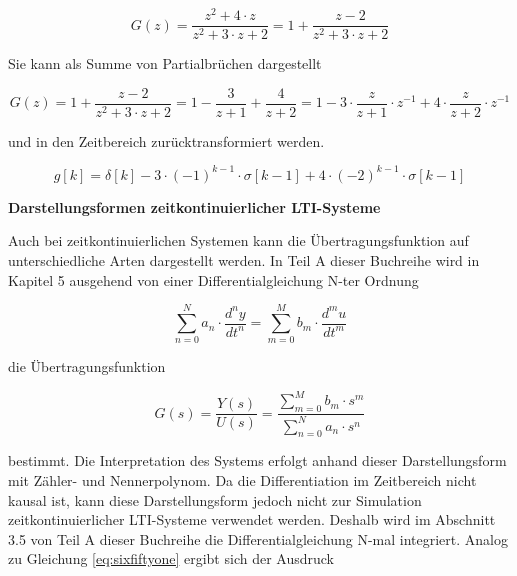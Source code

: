 \begin{equation}\label{eq:sixfiftyeight}
G\left(z\right)=\frac{z^{2} +4\cdot z}{z^{2} +3\cdot z+2} =1+\frac{z-2}{z^{2} +3\cdot z+2}
\end{equation}

\noindent Sie kann als Summe von Partialbr\"{u}chen dargestellt 

\begin{equation}\label{eq:sixfiftynine}
G\left(z\right)=1+\frac{z-2}{z^{2} +3\cdot z+2} =1-\frac{3}{z+1} +\frac{4}{z+2} =1-3\cdot \frac{z}{z+1} \cdot z^{-1} +4\cdot \frac{z}{z+2} \cdot z^{-1}
\end{equation}

\noindent und in den Zeitbereich zur\"{u}cktransformiert werden.

\begin{equation}\label{eq:sixsixty}
g\left[k\right]=\delta \left[k\right]-3\cdot \left(-1\right)^{k-1} \cdot \sigma \left[k-1\right]+4\cdot \left(-2\right)^{k-1} \cdot \sigma \left[k-1\right]
\end{equation}

\clearpage

{\selectfont
\noindent\textbf{Darstellungsformen zeitkontinuierlicher LTI-Systeme}}\smallskip

\noindent Auch bei zeitkontinuierlichen Systemen kann die \"{U}bertragungsfunktion auf unterschiedliche Arten dargestellt werden. In Teil A dieser Buchreihe wird in Kapitel 5 ausgehend von einer Differentialgleichung N-ter Ordnung

\begin{equation}\label{eq:sixsixtyone}
\sum _{n=0}^{N}a_{n} \cdot \frac{d^{n} y}{dt^{n} }  =\sum _{m=0}^{M}b_{m} \cdot \frac{d^{m} u}{dt^{m} } 
\end{equation}

\noindent die \"{U}bertragungsfunktion 

\begin{equation}\label{eq:sixsixtytwo}
G\left(s\right)=\frac{Y\left(s\right)}{U\left(s\right)} =\frac{\sum _{m=0}^{M}b_{m} \cdot s^{m}  }{\sum _{n=0}^{N}a_{n} \cdot s^{n}  }
\end{equation}

\noindent bestimmt. Die Interpretation des Systems erfolgt anhand dieser Darstellungsform mit Z\"{a}hler- und Nennerpolynom. Da die Differentiation im Zeitbereich nicht kausal ist, kann diese Darstellungsform jedoch nicht zur Simulation zeitkontinuierlicher LTI-Systeme verwendet werden. Deshalb wird im Abschnitt 3.5 von Teil A dieser Buchreihe die Differentialgleichung N-mal integriert. Analog zu Gleichung \eqref{eq:sixfiftyone} ergibt sich der Ausdruck

